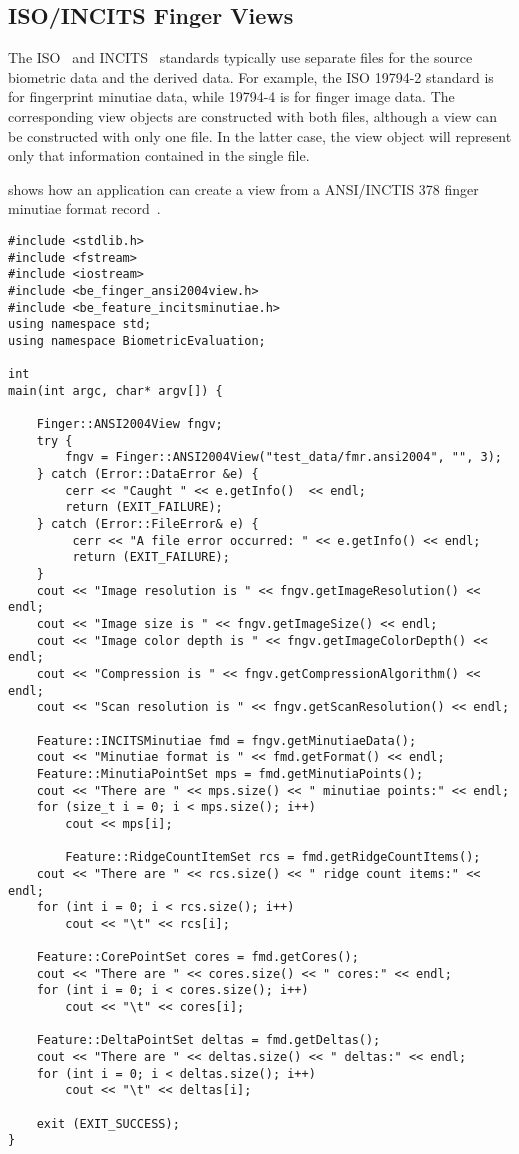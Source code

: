 \subsection{ISO/INCITS Finger Views}

The ISO~\cite{org:iso:sc37} and INCITS~\cite{org:incits} standards typically use
separate files for the source biometric data and the derived data. For example,
the ISO 19794-2 standard is for fingerprint minutiae data, while 19794-4 is for
finger image data. The corresponding \sname view objects are constructed with
both files, although a view can be constructed with only one file. In the
latter case, the view object will represent only that information contained in
the single file.

 shows how an application can create a view from
a ANSI/INCTIS 378 finger minutiae format record~\cite{std:ansi378-2004}.

\begin{lstlisting}[caption={Using an INCITS Finger View}, label=lst:incitsfingerviewuse]
#include <stdlib.h>
#include <fstream>
#include <iostream>
#include <be_finger_ansi2004view.h>
#include <be_feature_incitsminutiae.h>
using namespace std;
using namespace BiometricEvaluation;

int
main(int argc, char* argv[]) {

    Finger::ANSI2004View fngv;
    try {
        fngv = Finger::ANSI2004View("test_data/fmr.ansi2004", "", 3);
    } catch (Error::DataError &e) {
        cerr << "Caught " << e.getInfo()  << endl;
        return (EXIT_FAILURE);
    } catch (Error::FileError& e) {
         cerr << "A file error occurred: " << e.getInfo() << endl;
         return (EXIT_FAILURE);
    }
    cout << "Image resolution is " << fngv.getImageResolution() << endl;
    cout << "Image size is " << fngv.getImageSize() << endl;
    cout << "Image color depth is " << fngv.getImageColorDepth() << endl;
    cout << "Compression is " << fngv.getCompressionAlgorithm() << endl;
    cout << "Scan resolution is " << fngv.getScanResolution() << endl;
    
    Feature::INCITSMinutiae fmd = fngv.getMinutiaeData();
    cout << "Minutiae format is " << fmd.getFormat() << endl;
    Feature::MinutiaPointSet mps = fmd.getMinutiaPoints();
    cout << "There are " << mps.size() << " minutiae points:" << endl;
    for (size_t i = 0; i < mps.size(); i++)
        cout << mps[i];

        Feature::RidgeCountItemSet rcs = fmd.getRidgeCountItems();
    cout << "There are " << rcs.size() << " ridge count items:" << endl;
    for (int i = 0; i < rcs.size(); i++)
        cout << "\t" << rcs[i];

    Feature::CorePointSet cores = fmd.getCores();
    cout << "There are " << cores.size() << " cores:" << endl;
    for (int i = 0; i < cores.size(); i++)
        cout << "\t" << cores[i];

    Feature::DeltaPointSet deltas = fmd.getDeltas();
    cout << "There are " << deltas.size() << " deltas:" << endl;
    for (int i = 0; i < deltas.size(); i++)
        cout << "\t" << deltas[i];

    exit (EXIT_SUCCESS);
}
\end{lstlisting}
